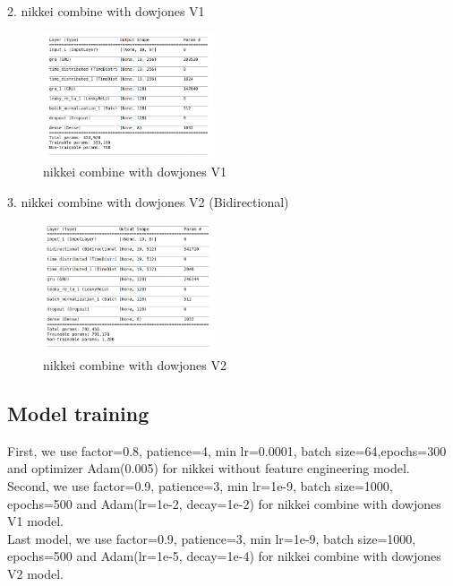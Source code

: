 \documentclass{article}
\begin{document}
2. nikkei combine with dowjones V1\\

\label{sec:latex}
\begin{figure}
  \centering
  \centerline{\includegraphics[width=0.45\textwidth]{V1.png}}
  \caption{nikkei combine with dowjones V1}
  \label{fig:bibtex}
\end{figure}

3. nikkei combine with dowjones V2 (Bidirectional)\\

\label{sec:latex}
\begin{figure}
  \centering
  \centerline{\includegraphics[width=0.45\textwidth]{V2.png}}
  \caption{nikkei combine with dowjones V2}
  \label{fig:bibtex}
\end{figure}


\subsection{Model training}
First, we use factor=0.8, patience=4, min lr=0.0001, batch size=64,epochs=300 and optimizer Adam(0.005)  for nikkei without feature engineering model.\\Second, we use factor=0.9, patience=3, min lr=1e-9, batch size=1000, epochs=500 and Adam(lr=1e-2, decay=1e-2) for nikkei combine with dowjones V1 model.\\Last model, we use factor=0.9, patience=3, min lr=1e-9, batch size=1000, epochs=500 and Adam(lr=1e-5, decay=1e-4) for nikkei combine with dowjones V2 model.
\end{document}
